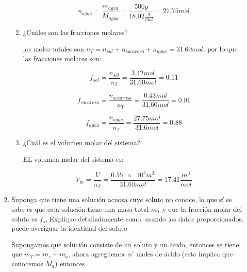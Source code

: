 \documentclass[12pt,a4paper]{article}
\begin{document}
\begin{enumerate}
\begin{enumerate}
        \begin{equation*}
            n_{agua} = \frac{m_{agua}}{M_{agua}} = \frac{500g}{18.02\frac{g}{mol}} = 27.75 mol
        \end{equation*}
        
        \item ¿Cuáles son las fracciones molares?
        
        los moles totales son $n_T = n_{sal}+ n_{sacarosa} + n_{agua} = 31.60 mol$, por lo que las fracciones molares son:
        
        \begin{equation*}
            f_{sal} = \frac{n_{sal}}{n_T} = \frac{3.42 mol}{31.60 mol} = 0.11
        \end{equation*}
        
        \begin{equation*}
            f_{sacarosa} = \frac{n_{sacarosa}}{n_T}= \frac{0.43mol}{31.60mol} = 0.01
        \end{equation*}
        
        \begin{equation*}
            f_{agua} = \frac{n_{agua}}{n_T} = \frac{27.75 mol}{31.6 mol} = 0.88
        \end{equation*}
        
        \item ¿Cuál es el volumen molar del sistema?
        
        EL volumen molar del sistema es:
        
        \begin{equation*}
            V_m = \frac{V}{n_T} = \frac{\num{0.55e3}m^3}{31.60 mol} = 17.41 \frac{m^3}{mol}
        \end{equation*}
    \end{enumerate}
    
    
    
    
    
    
    \item Suponga que tiene una solución acuosa cuyo soluto no conoce, lo que sí se sabe es que esta solución tiene una masa total $m_T$ y que la fracción molar del soluto es $f_s$, Explique detalladamente como, usando los datos proporcionados, puede averiguar la identidad del soluto
    
    Supongamos que solución consiste de un soluto y un ácido, entonces se tiene que $m_T = m_s + m_a$, ahora agreguemos $n'$ moles de ácido (esto implica que conocemos $M_a$) entonces
    

\end{enumerate}
\end{document}
